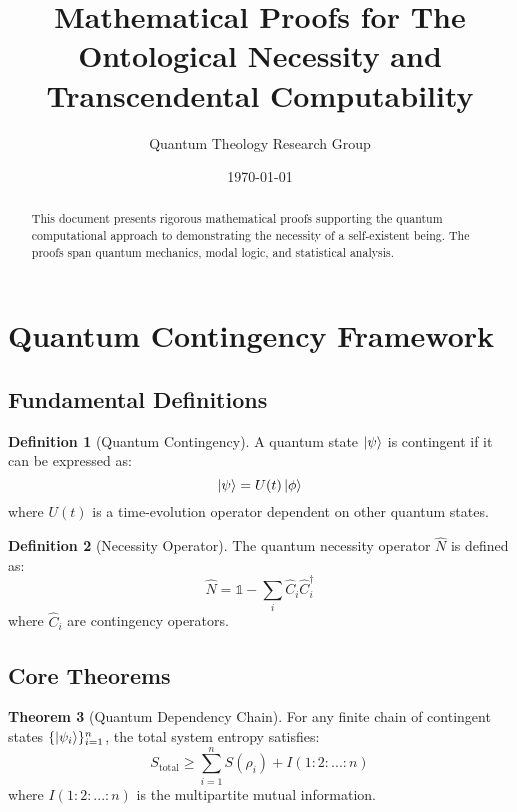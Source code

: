 \documentclass[12pt]{article}
\title{Mathematical Proofs for The Ontological Necessity and Transcendental Computability}
\author{Quantum Theology Research Group}
\date{\today}
\theoremstyle{definition}
\newtheorem{theorem}{Theorem}[section]
\newtheorem{definition}[theorem]{Definition}
\begin{document}
\maketitle

\begin{abstract}
This document presents rigorous mathematical proofs supporting the quantum computational approach to demonstrating the necessity of a self-existent being. The proofs span quantum mechanics, modal logic, and statistical analysis.
\end{abstract}

\tableofcontents

\section{Quantum Contingency Framework}

\subsection{Fundamental Definitions}

\begin{definition}[Quantum Contingency]
A quantum state $\ket{\psi}$ is contingent if it can be expressed as:
\begin{equation}
    \ket{\psi} = U(t)\ket{\phi}
\end{equation}
where $U(t)$ is a time-evolution operator dependent on other quantum states.
\end{definition}

\begin{definition}[Necessity Operator]
The quantum necessity operator $\hat{N}$ is defined as:
\begin{equation}
    \hat{N} = \mathbb{1} - \sum_i \hat{C}_i\hat{C}_i^\dagger
\end{equation}
where $\hat{C}_i$ are contingency operators.
\end{definition}

\subsection{Core Theorems}

\begin{theorem}[Quantum Dependency Chain]
For any finite chain of contingent states $\{\ket{\psi_i}\}_{i=1}^n$, the total system entropy satisfies:
\begin{equation}
    S_{\text{total}} \geq \sum_{i=1}^n S(\rho_i) + I(1:2:...:n)
\end{equation}
where $I(1:2:...:n)$ is the multipartite mutual information.
\end{theorem}
\end{document}

